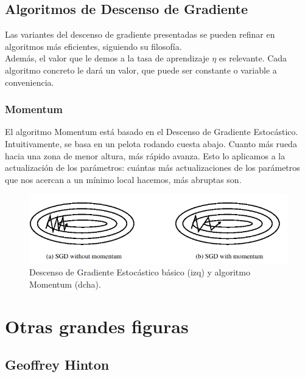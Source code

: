 \documentclass[11pt,twoside,titlepage,a4paper]{article}
\newcommand{\margenimagen}{
\newgeometry{
    left=2.5cm, %
	right=5cm, %
	bottom=2.5cm %
}
}
\numberwithin{equation}{section} %
\theoremstyle{usual}
\begin{document}
    \subsection{Algoritmos de Descenso de Gradiente}
    Las variantes del descenso de gradiente presentadas se pueden refinar en algoritmos más eficientes, siguiendo su filosofía. \\
    
    Además, el valor que le demos a la tasa de aprendizaje $\eta$ es relevante. Cada algoritmo concreto le dará un valor, que puede ser constante o variable a conveniencia.
    \newpage
    
        \subsubsection{Momentum}
        El algoritmo Momentum está basado en el Descenso de Gradiente Estocástico. Intuitivamente, se basa en un pelota rodando cuesta abajo. Cuanto más rueda hacia una zona de menor altura, más rápido avanza. Esto lo aplicamos a la actualización de los parámetros: cuántas más actualizaciones de los parámetros que nos acercan a un mínimo local hacemos, más abruptas son.
        \begin{figure}[h]
            \center
            \includegraphics[width=\textwidth]{Source/images/momentum.png}
            \caption{Descenso de Gradiente Estocástico básico (izq) y algoritmo Momentum (dcha).}
        \end{figure}
        
        
\newpage\margenimagen
\section{Otras grandes figuras} 

\subsection{Geoffrey Hinton}
\end{document}
